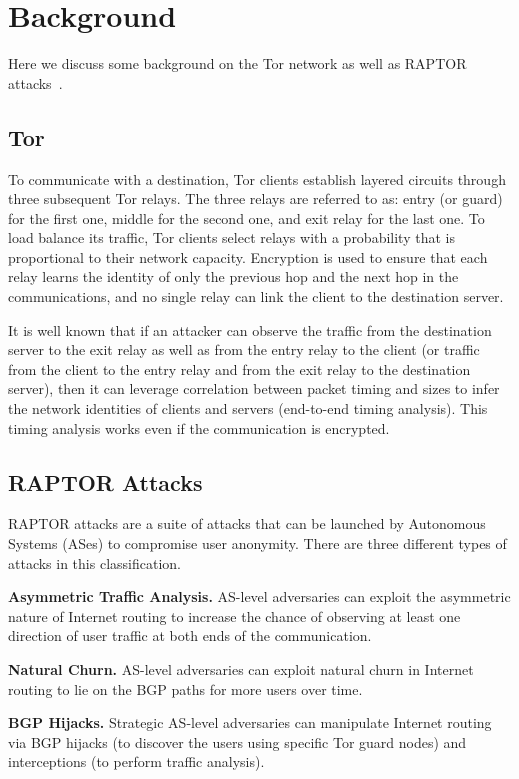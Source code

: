 \section{Background}
Here we discuss some background on the Tor network as well as RAPTOR attacks~\cite{sun2015raptor}.

\subsection{Tor}
To communicate with a destination, Tor clients establish
layered circuits through three subsequent Tor relays. The
three relays are referred to as: entry (or guard) for the
first one, middle for the second one, and exit relay for
the last one. To load balance its traffic, Tor clients select
relays with a probability that is proportional to their
network capacity. Encryption is used to ensure that each
relay learns the identity of only the previous hop and the
next hop in the communications, and no single relay can
link the client to the destination server.

It is well known that if an attacker can observe the
traffic from the destination server to the exit relay as well
as from the entry relay to the client (or traffic from the
client to the entry relay and from the exit relay to the
destination server), then it can leverage correlation between
packet timing and sizes to infer the network identities
of clients and servers (end-to-end timing analysis).
This timing analysis works even if the communication is
encrypted.

\subsection{RAPTOR Attacks}
RAPTOR attacks are a suite of attacks that can be launched by 
Autonomous Systems (ASes) to compromise user anonymity.  There are 
three different types of attacks in this classification.

{\bf Asymmetric Traffic Analysis.} AS-level adversaries can
exploit the asymmetric nature of Internet routing to increase
the chance of observing at least one direction of
user traffic at both ends of the communication.

{\bf Natural Churn.} AS-level adversaries can exploit natural churn in Internet
routing to lie on the BGP paths for more users over
time.

{\bf BGP Hijacks.} Strategic AS-level adversaries can manipulate Internet
routing via BGP hijacks (to discover the users using
specific Tor guard nodes) and interceptions (to perform
traffic analysis).
